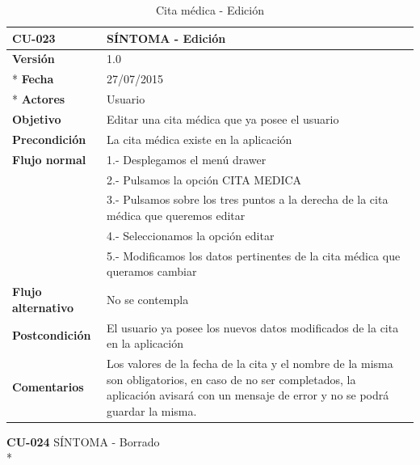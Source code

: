 \documentclass[../pfc.tex]{subfiles}
\begin{document}
		\begin{table}[H]
			\centering
			\begin{tabular}[t]{|p{3cm}|p{9.5cm}|}
				\hline \textbf{CU-023} & \textbf{SÍNTOMA - Edición} \\*
				\hline\hline \textbf{Versión} & 1.0 \\ *
				\hline\hline \textbf{Fecha} & 27/07/2015 \\ *
				\hline\textbf{Actores} 	& Usuario\\*
				\hline \textbf{Objetivo} & Editar una cita médica que ya posee el usuario\\* 			
				\hline \textbf{Precondición} & La cita médica existe en la aplicación\\* 
				\hline \textbf{Flujo normal} & 1.- Desplegamos el menú drawer \\* 
				& 2.- Pulsamos la opción CITA MEDICA\\*	
				& 3.- Pulsamos sobre los tres puntos a la derecha de la cita médica que queremos editar\\*	
				& 4.- Seleccionamos la opción editar\\*	
				& 5.- Modificamos los datos pertinentes de la cita médica que queramos cambiar\\*	
				\hline \textbf{Flujo alternativo} & No se contempla \\* 
				\hline \textbf{Postcondición} & El usuario ya posee los nuevos datos modificados de la cita en la aplicación \\* 
				\hline \textbf{Comentarios}   & Los valores de la fecha de la cita y el nombre de la misma son obligatorios, en caso de no ser completados, la aplicación avisará con un mensaje de error y no se podrá guardar la misma.\\*
				\hline
			\end{tabular}
			\caption{Cita médica - Edición}
			\label{tabla:caso023}
		\end{table}
		
		
		
		\textbf{CU-024}	SÍNTOMA - Borrado\\*
		
\end{document}
